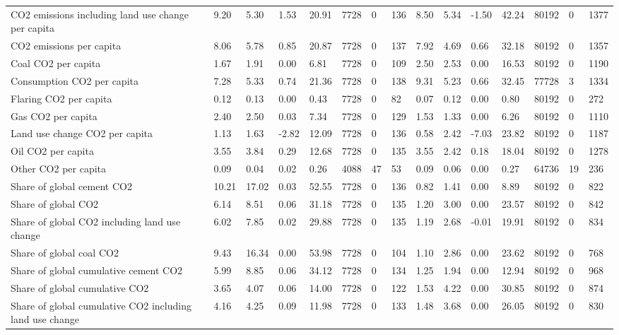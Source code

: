 \begin{longtable}{lllllllllllllll}
CO2 emissions including land use change per capita & 9.20 & 5.30 & 1.53 & 20.91 & 7728 & 0 & 136 & 8.50 & 5.34 & -1.50 & 42.24 & 80192 & 0 & 1377\\
CO2 emissions per capita & 8.06 & 5.78 & 0.85 & 20.87 & 7728 & 0 & 137 & 7.92 & 4.69 & 0.66 & 32.18 & 80192 & 0 & 1357\\
Coal CO2 per capita & 1.67 & 1.91 & 0.00 & 6.81 & 7728 & 0 & 109 & 2.50 & 2.53 & 0.00 & 16.53 & 80192 & 0 & 1190\\
\addlinespace
Consumption CO2 per capita & 7.28 & 5.33 & 0.74 & 21.36 & 7728 & 0 & 138 & 9.31 & 5.23 & 0.66 & 32.45 & 77728 & 3 & 1334\\
Flaring CO2 per capita & 0.12 & 0.13 & 0.00 & 0.43 & 7728 & 0 & 82 & 0.07 & 0.12 & 0.00 & 0.80 & 80192 & 0 & 272\\
Gas CO2 per capita & 2.40 & 2.50 & 0.03 & 7.34 & 7728 & 0 & 129 & 1.53 & 1.33 & 0.00 & 6.26 & 80192 & 0 & 1110\\
Land use change CO2 per capita & 1.13 & 1.63 & -2.82 & 12.09 & 7728 & 0 & 136 & 0.58 & 2.42 & -7.03 & 23.82 & 80192 & 0 & 1187\\
Oil CO2 per capita & 3.55 & 3.84 & 0.29 & 12.68 & 7728 & 0 & 135 & 3.55 & 2.42 & 0.18 & 18.04 & 80192 & 0 & 1278\\
\addlinespace
Other CO2 per capita & 0.09 & 0.04 & 0.02 & 0.26 & 4088 & 47 & 53 & 0.09 & 0.06 & 0.00 & 0.27 & 64736 & 19 & 236\\
Share of global cement CO2 & 10.21 & 17.02 & 0.03 & 52.55 & 7728 & 0 & 136 & 0.82 & 1.41 & 0.00 & 8.89 & 80192 & 0 & 822\\
Share of global CO2 & 6.14 & 8.51 & 0.06 & 31.18 & 7728 & 0 & 135 & 1.20 & 3.00 & 0.00 & 23.57 & 80192 & 0 & 842\\
Share of global CO2 including land use change & 6.02 & 7.85 & 0.02 & 29.88 & 7728 & 0 & 135 & 1.19 & 2.68 & -0.01 & 19.91 & 80192 & 0 & 834\\
Share of global coal CO2 & 9.43 & 16.34 & 0.00 & 53.98 & 7728 & 0 & 104 & 1.10 & 2.86 & 0.00 & 23.62 & 80192 & 0 & 768\\
\addlinespace
Share of global cumulative cement CO2 & 5.99 & 8.85 & 0.06 & 34.12 & 7728 & 0 & 134 & 1.25 & 1.94 & 0.00 & 12.94 & 80192 & 0 & 968\\
Share of global cumulative CO2 & 3.65 & 4.07 & 0.06 & 14.00 & 7728 & 0 & 122 & 1.53 & 4.22 & 0.00 & 30.85 & 80192 & 0 & 874\\
Share of global cumulative CO2 including land use change & 4.16 & 4.25 & 0.09 & 11.98 & 7728 & 0 & 133 & 1.48 & 3.68 & 0.00 & 26.05 & 80192 & 0 & 830\\

\end{longtable}
